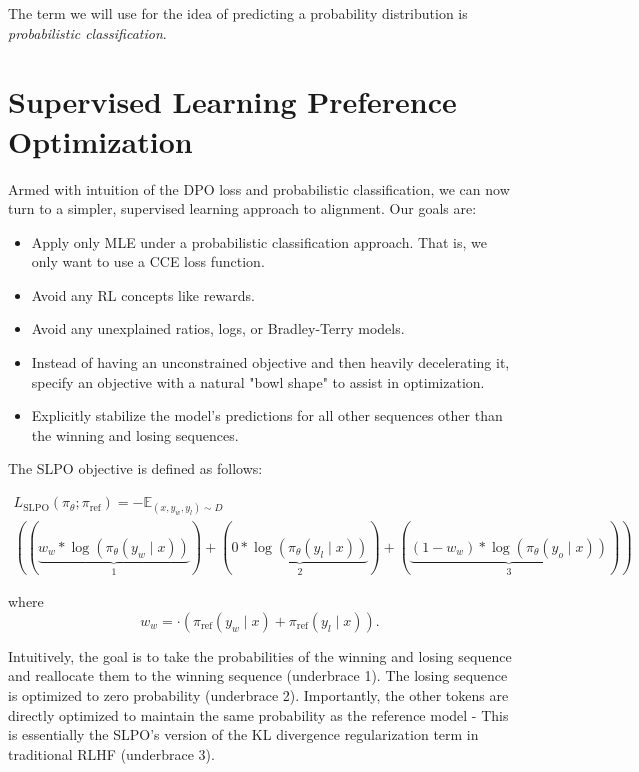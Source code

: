 \documentclass[twoside,11pt]{article}
\begin{document}
The term we will use for the idea of
predicting a probability distribution is \emph{probabilistic classification}.

\section{Supervised Learning Preference Optimization}

Armed with intuition of the DPO loss and probabilistic classification, we can
now turn to a simpler, supervised learning approach to alignment. Our
goals are:
\begin{itemize}
\item Apply only MLE under a probabilistic classification approach. 
  That is, we only want to use a CCE loss function. 
\item Avoid any RL concepts like rewards.
\item Avoid any unexplained ratios, logs, or Bradley-Terry models.
\item Instead of having an unconstrained objective and then heavily 
  decelerating it, specify an objective with a natural "bowl shape" to assist
  in optimization.
\item Explicitly stabilize the model's predictions for all other sequences
  other than the winning and losing sequences.
\end{itemize} 

The SLPO objective is defined as follows:

\begin{multline}
  L_\mathrm{SLPO}(\pi_\theta; \pi_\mathrm{ref}) =
  -\mathbb{E}_{(x, y_w, y_l) \sim D} \\
  \left(
  \left(
    \underbrace{
      w_w * \log(\pi_\theta(y_w \mid x))
    }_{1}
  \right)
    + 
  \left(
    \underbrace{
      0 * \log(\pi_\theta(y_l \mid x))
    }_{2}
  \right)
  + 
  \left(
    \underbrace{
      (1 - w_w) * \log(\pi_\theta(y_o \mid x))
    }_{3}
  \right) 
  \right)
\end{multline}

where 
\[
w_w =  \cdot \left( \pi_\mathrm{ref}(y_w \mid x) + \pi_\mathrm{ref}(y_l \mid x) \right).
\]

Intuitively, the goal is to take the probabilities of the winning
and losing sequence and reallocate them to the winning sequence (underbrace 1).
The losing sequence is optimized to zero probability (underbrace 2). 
Importantly,
the other tokens are directly optimized to maintain 
the same probability as the reference model - 
This is essentially the SLPO's version of
the KL divergence regularization term in traditional RLHF (underbrace 3). 
\end{document}
